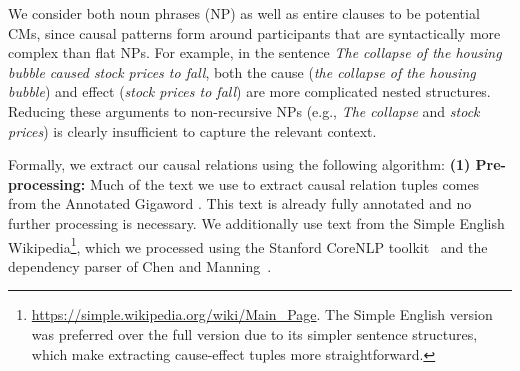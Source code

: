 We consider both noun phrases (NP) as well as entire %
clauses to be potential CMs, since causal patterns form around participants that are syntactically more complex than flat NPs.  
For example, in the sentence \emph{The collapse of the housing bubble caused stock prices to fall}, both the cause ({\em the collapse of the housing bubble}) and effect ({\em stock prices to fall}) are more complicated nested structures.  Reducing these arguments to non-recursive NPs (e.g., {\em The collapse} and {\em stock prices}) is clearly insufficient to capture the relevant context.


%
%



Formally, we extract our causal relations using the following algorithm:
{\flushleft \textbf{(1) Pre-processing:}} Much of the text we use to extract causal relation tuples comes from the Annotated Gigaword \cite{napoles2012annotated}.  This text is already fully annotated and no further processing is necessary.  We additionally use text from the Simple English Wikipedia\footnote{{\scriptsize \url{https://simple.wikipedia.org/wiki/Main_Page}}.  The Simple English version was preferred over the full version due to its simpler sentence structures, which make extracting cause-effect tuples more straightforward.}, which we processed using the Stanford CoreNLP toolkit~\cite{Manning:14} and the dependency parser of Chen and Manning~\citeyear{chen14}.


